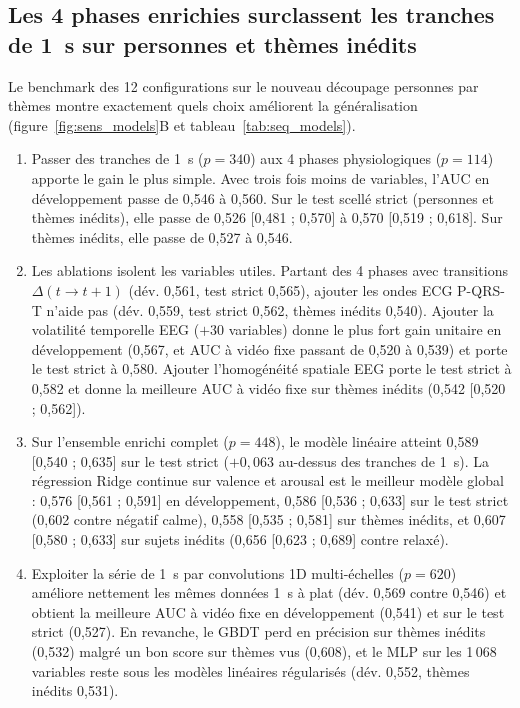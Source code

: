 \documentclass[10pt]{article}
\begin{document}
\subsection{Les 4 phases enrichies surclassent les tranches de 1~s sur personnes et thèmes inédits}

Le benchmark des 12 configurations sur le nouveau découpage personnes par thèmes montre exactement quels choix améliorent la généralisation (figure~\ref{fig:sens_models}B et tableau~\ref{tab:seq_models}).
\begin{enumerate}
\item Passer des tranches de 1~s ($p = 340$) aux 4 phases physiologiques ($p = 114$) apporte le gain le plus simple. Avec trois fois moins de variables, l'AUC en développement passe de 0,546 à 0,560. Sur le test scellé strict (personnes et thèmes inédits), elle passe de 0,526 [0,481 ; 0,570] à 0,570 [0,519 ; 0,618]. Sur thèmes inédits, elle passe de 0,527 à 0,546.
\item Les ablations isolent les variables utiles. Partant des 4 phases avec transitions $\Delta(t\to t+1)$ (dév. 0,561, test strict 0,565), ajouter les ondes ECG P-QRS-T n'aide pas (dév. 0,559, test strict 0,562, thèmes inédits 0,540). Ajouter la volatilité temporelle EEG ($+30$ variables) donne le plus fort gain unitaire en développement (0,567, et AUC à vidéo fixe passant de 0,520 à 0,539) et porte le test strict à 0,580. Ajouter l'homogénéité spatiale EEG porte le test strict à 0,582 et donne la meilleure AUC à vidéo fixe sur thèmes inédits (0,542 [0,520 ; 0,562]).
\item Sur l'ensemble enrichi complet ($p = 448$), le modèle linéaire atteint 0,589 [0,540 ; 0,635] sur le test strict ($+0{,}063$ au-dessus des tranches de 1~s). La régression Ridge continue sur valence et arousal est le meilleur modèle global : 0,576 [0,561 ; 0,591] en développement, 0,586 [0,536 ; 0,633] sur le test strict (0,602 contre négatif calme), 0,558 [0,535 ; 0,581] sur thèmes inédits, et 0,607 [0,580 ; 0,633] sur sujets inédits (0,656 [0,623 ; 0,689] contre relaxé).
\item Exploiter la série de 1~s par convolutions 1D multi-échelles ($p = 620$) améliore nettement les mêmes données 1~s à plat (dév. 0,569 contre 0,546) et obtient la meilleure AUC à vidéo fixe en développement (0,541) et sur le test strict (0,527). En revanche, le GBDT perd en précision sur thèmes inédits (0,532) malgré un bon score sur thèmes vus (0,608), et le MLP sur les 1\,068 variables reste sous les modèles linéaires régularisés (dév. 0,552, thèmes inédits 0,531).
\end{enumerate}
\end{document}
